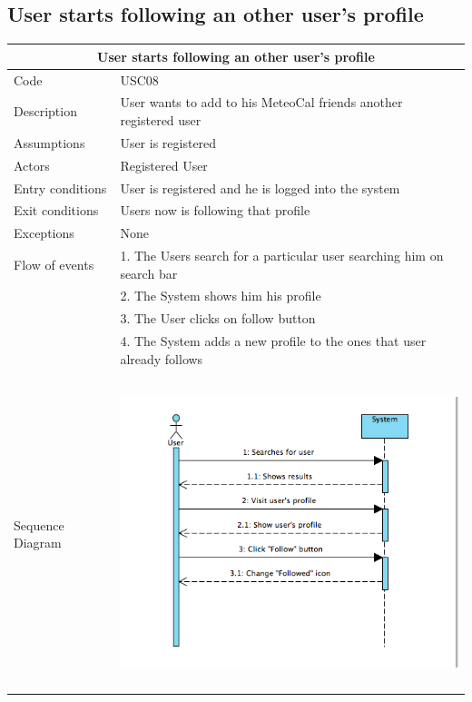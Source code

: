 \documentclass[12pt]{book}
\begin{document}
\subsection{User starts following an other user's profile}
\begin{center}
\vspace*{\fill}
\begin{tabular}{ |l|l| }
  		\hline
  		\hline
  		\multicolumn{2}{|c|}{\large{\textbf{User starts following an other user's profile}}} \\
  		\hline
  		\hline
  		Code  & USC08\\ 
		\hline
		Description &  User wants to add to his MeteoCal friends another registered user\\
		\hline
		Assumptions & User is registered\\
		\hline
		Actors & Registered User\\
		\hline
		Entry conditions & User is registered and he is logged into the system\\
		\hline
		Exit conditions & Users now is following that profile  \\
		\hline
		Exceptions & None  \\
		\hline
		Flow of events &  
			1. The Users search for a particular user searching him on search bar\\&			
			2. The System shows him his profile\\&
			3. The User clicks on follow button\\&
			4. The System adds a new profile to the ones that user already follows  \\
  		\hline 
		&\\
		Sequence Diagram &  \includegraphics[width=13cm,height=9cm]{followSD}  \\
		\hline
  		\hline
\end{tabular} \\
\end{center}
\vspace*{\fill}
\end{document}
